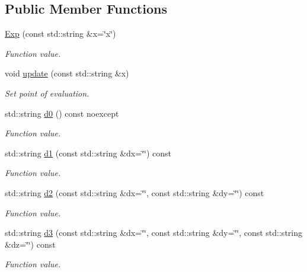 \subsection*{Public Member Functions}
\begin{DoxyCompactItemize}
\item 
\hyperlink{structFunG_1_1stringify_1_1Exp_a70a0b1639fa4ea5ffbf37345d3d8de53}{Exp} (const std\-::string \&x=\char`\"{}x\char`\"{})
\begin{DoxyCompactList}\small\item\em Function value. \end{DoxyCompactList}\item 
void \hyperlink{structFunG_1_1stringify_1_1Exp_a5a2e79edbfa8073ad68e27b9cb27468f}{update} (const std\-::string \&x)
\begin{DoxyCompactList}\small\item\em Set point of evaluation. \end{DoxyCompactList}\item 
std\-::string \hyperlink{structFunG_1_1stringify_1_1Exp_a1ad860a95100cc31f7cdf5e1f37f60cd}{d0} () const noexcept
\begin{DoxyCompactList}\small\item\em Function value. \end{DoxyCompactList}\item 
std\-::string \hyperlink{structFunG_1_1stringify_1_1Exp_a3e6070ac1dbb3ce42795c6d84a29d21a}{d1} (const std\-::string \&dx=\char`\"{}\char`\"{}) const 
\begin{DoxyCompactList}\small\item\em Function value. \end{DoxyCompactList}\item 
std\-::string \hyperlink{structFunG_1_1stringify_1_1Exp_a25a7af7e815699e09d277d6640f6b6f3}{d2} (const std\-::string \&dx=\char`\"{}\char`\"{}, const std\-::string \&dy=\char`\"{}\char`\"{}) const 
\begin{DoxyCompactList}\small\item\em Function value. \end{DoxyCompactList}\item 
std\-::string \hyperlink{structFunG_1_1stringify_1_1Exp_a8fbdc564252405abfa2c13f52e6b3e91}{d3} (const std\-::string \&dx=\char`\"{}\char`\"{}, const std\-::string \&dy=\char`\"{}\char`\"{}, const std\-::string \&dz=\char`\"{}\char`\"{}) const 
\begin{DoxyCompactList}\small\item\em Function value. \end{DoxyCompactList}\end{DoxyCompactItemize}



